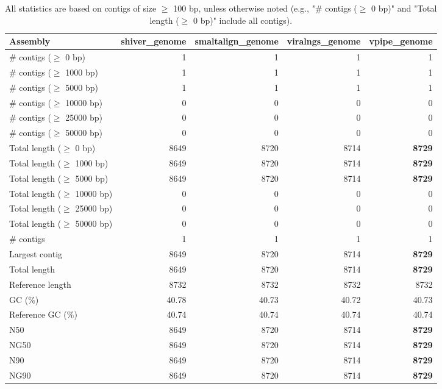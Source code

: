 \documentclass[12pt,a4paper]{article}
\begin{document}
\begin{table}[ht]
\begin{center}
\caption{All statistics are based on contigs of size $\geq$ 100 bp, unless otherwise noted (e.g., "\# contigs ($\geq$ 0 bp)" and "Total length ($\geq$ 0 bp)" include all contigs).}
\begin{tabular}{|l*{4}{|r}|}
\hline
Assembly & shiver\_genome & smaltalign\_genome & viralngs\_genome & vpipe\_genome \\ \hline
\# contigs ($\geq$ 0 bp) & 1 & 1 & 1 & 1 \\ \hline
\# contigs ($\geq$ 1000 bp) & 1 & 1 & 1 & 1 \\ \hline
\# contigs ($\geq$ 5000 bp) & 1 & 1 & 1 & 1 \\ \hline
\# contigs ($\geq$ 10000 bp) & 0 & 0 & 0 & 0 \\ \hline
\# contigs ($\geq$ 25000 bp) & 0 & 0 & 0 & 0 \\ \hline
\# contigs ($\geq$ 50000 bp) & 0 & 0 & 0 & 0 \\ \hline
Total length ($\geq$ 0 bp) & 8649 & 8720 & 8714 & {\bf 8729} \\ \hline
Total length ($\geq$ 1000 bp) & 8649 & 8720 & 8714 & {\bf 8729} \\ \hline
Total length ($\geq$ 5000 bp) & 8649 & 8720 & 8714 & {\bf 8729} \\ \hline
Total length ($\geq$ 10000 bp) & 0 & 0 & 0 & 0 \\ \hline
Total length ($\geq$ 25000 bp) & 0 & 0 & 0 & 0 \\ \hline
Total length ($\geq$ 50000 bp) & 0 & 0 & 0 & 0 \\ \hline
\# contigs & 1 & 1 & 1 & 1 \\ \hline
Largest contig & 8649 & 8720 & 8714 & {\bf 8729} \\ \hline
Total length & 8649 & 8720 & 8714 & {\bf 8729} \\ \hline
Reference length & 8732 & 8732 & 8732 & 8732 \\ \hline
GC (\%) & 40.78 & 40.73 & 40.72 & 40.73 \\ \hline
Reference GC (\%) & 40.74 & 40.74 & 40.74 & 40.74 \\ \hline
N50 & 8649 & 8720 & 8714 & {\bf 8729} \\ \hline
NG50 & 8649 & 8720 & 8714 & {\bf 8729} \\ \hline
N90 & 8649 & 8720 & 8714 & {\bf 8729} \\ \hline
NG90 & 8649 & 8720 & 8714 & {\bf 8729} \\ \hline

\end{tabular}
\end{center}
\end{table}
\end{document}
